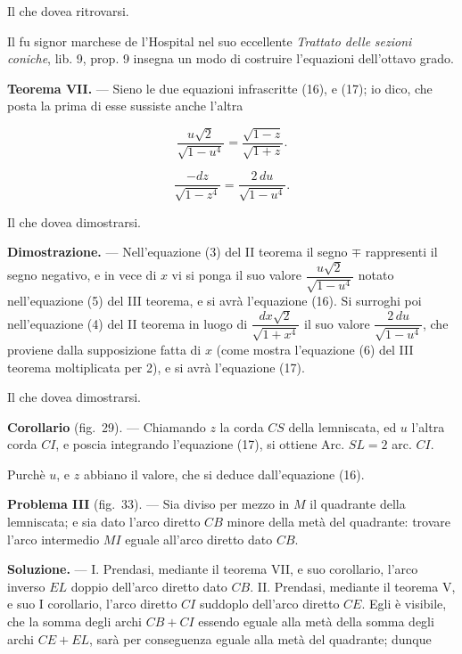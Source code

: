 \documentclass{article}
\begin{document}
Il che dovea ritrovarsi.

Il fu signor marchese de l'Hospital nel suo eccellente \emph{Trattato delle}
\emph{sezioni coniche}, lib. 9, prop. 9 insegna un modo di costruire l'equazioni dell'ottavo
grado.

\textbf{Teorema VII.} --- Sieno le due equazioni infrascritte (16), e (17); io dico, che posta la
prima di esse sussiste anche l'altra

\[ \frac{u\sqrt{2}}{\sqrt{1-u^{4}}} = \frac{\sqrt{1-z}}{\sqrt{1+z}}. \tag{16} \]

\[ \frac{-dz}{\sqrt{1-z^{4}}} = \frac{2\,du}{\sqrt{1-u^{4}}}. \tag{17} \]

Il che dovea dimostrarsi.

\textbf{Dimostrazione.} --- Nell'equazione (3) del II teorema il segno $\mp$ rappresenti il segno
negativo, e in vece di $x$ vi si ponga il suo valore $\dfrac{u\sqrt{2}}{\sqrt{1-u^{4}}}$ notato
nell'equazione (5) del III teorema, e si avrà l'equazione (16). Si surroghi poi nell'equazione (4)
del II teorema in luogo di $\dfrac{dx\sqrt{2}}{\sqrt{1+x^{4}}}$ il suo valore
$\dfrac{2\,du}{\sqrt{1-u^{4}}}$, che proviene dalla supposizione fatta di $x$ (come mostra
l'equazione (6) del III teorema moltiplicata per 2), e si avrà l'equazione (17).

Il che dovea dimostrarsi.

\textbf{Corollario} (fig.~29). --- Chiamando $z$ la corda $CS$ della lemniscata, ed $u$ l'altra
corda $CI$, e poscia integrando l'equazione (17), si ottiene Arc. $SL = 2$ arc. $CI$.

Purchè $u$, e $z$ abbiano il valore, che si deduce dall'equazione (16).

\textbf{Problema III} (fig.~33). --- Sia diviso per mezzo in $M$ il quadrante della lemniscata; e
sia dato l'arco diretto $CB$ minore della metà del quadrante: trovare l'arco intermedio $MI$
eguale all'arco diretto dato $CB$.


\textbf{Soluzione.} --- I. Prendasi, mediante il teorema VII, e suo corollario, l'arco inverso
$EL$ doppio dell'arco diretto dato $CB$. II. Prendasi, mediante il teorema V, e suo I corollario,
l'arco diretto $CI$ suddoplo dell'arco diretto $CE$. Egli è visibile, che la somma degli archi
$CB + CI$
essendo eguale alla metà della somma degli archi $CE + EL$, sarà per conseguenza eguale alla metà
del quadrante; dunque
\end{document}
